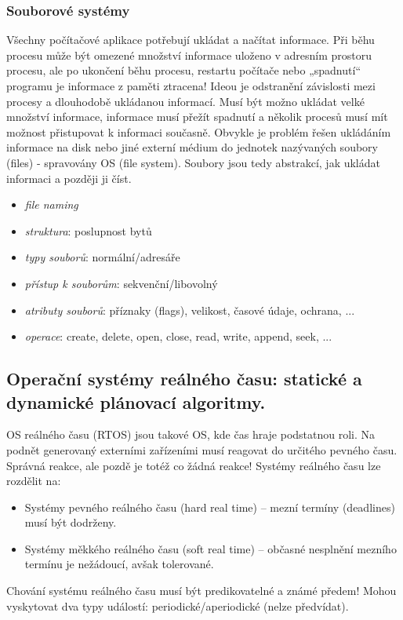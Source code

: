 \subsubsection*{Souborové systémy}
Všechny počítačové aplikace potřebují ukládat a načítat informace. Při běhu procesu může být omezené množství informace uloženo v adresním prostoru procesu, ale po ukončení běhu procesu, restartu počítače nebo „spadnutí“ programu je informace z paměti ztracena! Ideou je odstranění závislosti mezi procesy a dlouhodobě ukládanou informací. Musí být možno ukládat velké množství informace, informace musí přežít spadnutí a několik procesů musí mít možnost přistupovat k informaci současně. Obvykle je problém řešen ukládáním informace na disk nebo jiné externí médium do jednotek nazývaných soubory (files) - spravovány OS (file system). Soubory jsou tedy abstrakcí, jak ukládat informaci a později ji číst.
\begin{itemize}
\item \textit{file naming}
\item \textit{struktura}: poslupnost bytů
\item \textit{typy souborů}: normální/adresáře
\item \textit{přístup k souborům}: sekvenční/libovolný
\item \textit{atributy souborů}: příznaky (flags), velikost, časové údaje, ochrana, ...
\item \textit{operace}: create, delete, open, close, read, write, append, seek, ...
\end{itemize}


\subsection{Operační systémy reálného času: statické a dynamické plánovací algoritmy.}
OS reálného času (RTOS) jsou takové OS, kde čas hraje podstatnou roli. Na podnět generovaný externími zařízeními musí reagovat do určitého pevného času. Správná reakce, ale pozdě je totéž co žádná reakce! Systémy reálného času lze rozdělit na:
\begin{itemize}
\item Systémy pevného reálného času (hard real time) – mezní termíny (deadlines) musí být dodrženy.
\item Systémy měkkého reálného času (soft real time) – občasné nesplnění mezního termínu je nežádoucí, avšak tolerované.
\end{itemize}
Chování systému reálného času musí být predikovatelné a známé předem! Mohou vyskytovat dva typy událostí: periodické/aperiodické (nelze předvídat).

